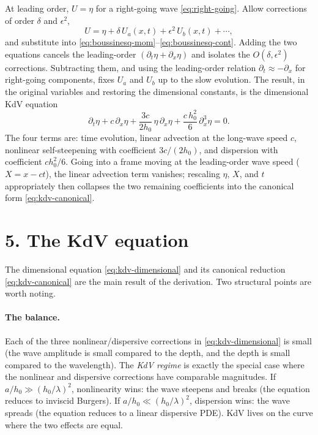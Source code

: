 \documentclass{article}
\begin{document}
At leading order, \(U = \eta\) for a right-going wave \eqref{eq:right-going}. Allow corrections of order \(\delta\) and \(\epsilon^2\),
\[
U = \eta + \delta\, U_a(x, t) + \epsilon^2\, U_b(x, t) + \cdots,
\]
and substitute into \eqref{eq:boussinesq-mom}--\eqref{eq:boussinesq-cont}. Adding the two equations cancels the leading-order \((\partial_t \eta + \partial_x \eta)\) and isolates the \(O(\delta, \epsilon^2)\) corrections. Subtracting them, and using the leading-order relation \(\partial_t \approx -\partial_x\) for right-going components, fixes \(U_a\) and \(U_b\) up to the slow evolution. The result, in the original variables and restoring the dimensional constants, is the dimensional KdV equation
\begin{equation}
\boxed{\;
\partial_t \eta + c\, \partial_x \eta + \frac{3 c}{2 h_0}\, \eta\, \partial_x \eta + \frac{c\, h_0^2}{6}\, \partial_x^3 \eta = 0.
\;}
\label{eq:kdv-dimensional}
\end{equation}
The four terms are: time evolution, linear advection at the long-wave speed \(c\), nonlinear self-steepening with coefficient \(3c/(2h_0)\), and dispersion with coefficient \(c h_0^2/6\). Going into a frame moving at the leading-order wave speed (\(X = x - c t\)), the linear advection term vanishes; rescaling \(\eta\), \(X\), and \(t\) appropriately then collapses the two remaining coefficients into the canonical form \eqref{eq:kdv-canonical}.

\section*{5. The KdV equation}

The dimensional equation \eqref{eq:kdv-dimensional} and its canonical reduction \eqref{eq:kdv-canonical} are the main result of the derivation. Two structural points are worth noting.

\paragraph{The balance.} Each of the three nonlinear/dispersive corrections in \eqref{eq:kdv-dimensional} is small (the wave amplitude is small compared to the depth, and the depth is small compared to the wavelength). The \emph{KdV regime} is exactly the special case where the nonlinear and dispersive corrections have comparable magnitudes. If \(a/h_0 \gg (h_0/\lambda)^2\), nonlinearity wins: the wave steepens and breaks (the equation reduces to inviscid Burgers). If \(a/h_0 \ll (h_0/\lambda)^2\), dispersion wins: the wave spreads (the equation reduces to a linear dispersive PDE). KdV lives on the curve where the two effects are equal.
\end{document}
